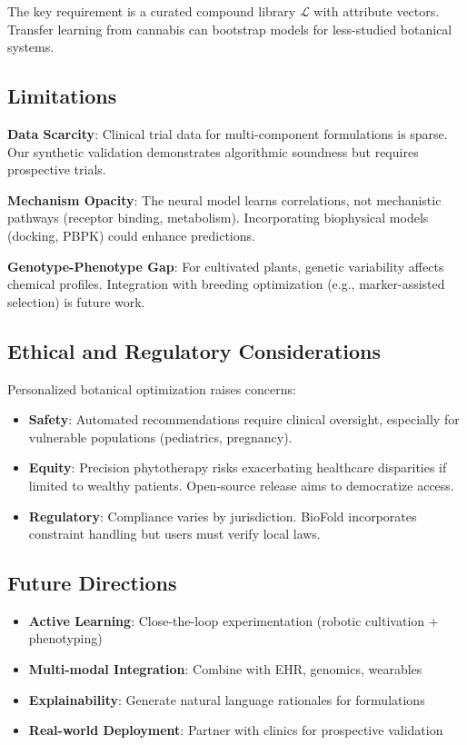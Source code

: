 \documentclass[11pt,a4paper]{article}
\begin{document}
The key requirement is a curated compound library \(\mathcal{L}\) with attribute vectors. Transfer learning from cannabis can bootstrap models for less-studied botanical systems.

\subsection{Limitations}

\textbf{Data Scarcity}: Clinical trial data for multi-component formulations is sparse. Our synthetic validation demonstrates algorithmic soundness but requires prospective trials.

\textbf{Mechanism Opacity}: The neural model learns correlations, not mechanistic pathways (receptor binding, metabolism). Incorporating biophysical models (docking, PBPK) could enhance predictions.

\textbf{Genotype-Phenotype Gap}: For cultivated plants, genetic variability affects chemical profiles. Integration with breeding optimization (e.g., marker-assisted selection) is future work.

\subsection{Ethical and Regulatory Considerations}

Personalized botanical optimization raises concerns:
\begin{itemize}
    \item \textbf{Safety}: Automated recommendations require clinical oversight, especially for vulnerable populations (pediatrics, pregnancy).
    \item \textbf{Equity}: Precision phytotherapy risks exacerbating healthcare disparities if limited to wealthy patients. Open-source release aims to democratize access.
    \item \textbf{Regulatory}: Compliance varies by jurisdiction. BioFold incorporates constraint handling but users must verify local laws.
\end{itemize}

\subsection{Future Directions}

\begin{itemize}
    \item \textbf{Active Learning}: Close-the-loop experimentation (robotic cultivation + phenotyping)
    \item \textbf{Multi-modal Integration}: Combine with EHR, genomics, wearables
    \item \textbf{Explainability}: Generate natural language rationales for formulations
    \item \textbf{Real-world Deployment}: Partner with clinics for prospective validation
\end{itemize}
\end{document}
